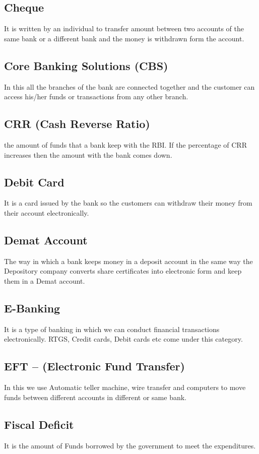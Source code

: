 \documentclass[11pt]{article}
\begin{document}
\subsection{Cheque}
\label{sec:orgde2e222}
It is written by an individual to transfer amount between two accounts
of the same bank or a different bank and the money is withdrawn form
the account.
\subsection{Core Banking Solutions (CBS)}
\label{sec:org45ba0b8}
In this all the branches of the bank are connected together and the
customer can access his/her funds or transactions from any other
branch.
\subsection{CRR (Cash Reverse Ratio)}
\label{sec:orge302a7a}
the amount of funds that a bank keep with the RBI. If the percentage
of CRR increases then the amount with the bank comes down.
\subsection{Debit Card}
\label{sec:orga89626f}
It is a card issued by the bank so the customers can withdraw their
money from their account electronically.
\subsection{Demat Account}
\label{sec:orgda85b0c}
The way in which a bank keeps money in a deposit account in the same
way the Depository company converts share certificates into electronic
form and keep them in a Demat account.
\subsection{E-Banking}
\label{sec:orgefbbd68}
It is a type of banking in which we can conduct financial transactions
electronically. RTGS, Credit cards, Debit cards etc come under this
category.
\subsection{EFT – (Electronic Fund Transfer)}
\label{sec:org87d03ed}
In this we use Automatic teller machine, wire transfer and computers
to move funds between different accounts in different or same bank.
\subsection{Fiscal Deficit}
\label{sec:orgafcdfba}
It is the amount of Funds borrowed by the government to meet the
expenditures.
\end{document}
